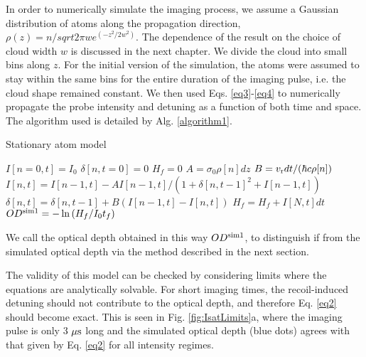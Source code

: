In order to numerically simulate the imaging process, we assume a Gaussian distribution of atoms along the propagation direction, $\rho(z) = n/sqrt{2\pi}w e^(-z^2/2w^2)$. The dependence of the result on the choice of cloud  width $w$ is discussed in the next chapter. We divide the cloud into small bins along $z$. For the initial version of the simulation, the atoms were assumed to stay within the same bins for the entire duration of the imaging pulse, i.e. the cloud shape remained constant. We then used Eqs. \ref{eq3}-\ref{eq4} to numerically propagate the probe intensity and detuning as a function of both time and space. The algorithm used is detailed by Alg. \ref{algorithm1}.
%

\begin{algorithm}
\caption{Stationary atom model}
\label{algorithm1}
\begin{algorithmic}
\STATE $I[n=0,t]=I_0$ 
\STATE $\delta[n, t=0]=0$ 
\STATE $H_f=0$ 
 \STATE $A=\sigma_0\rho[n] dz$ 
 \STATE $B=v_{\rm{r}} dt/(\hbar c \rho[n])$  
\STATE $I[n,t]=I[n-1,t] - A I[n-1,t]/(1+\delta[n,t-1]^2+I[n-1,t])$  
\STATE $\delta[n,t]=\delta[n,t-1]+B\left(I[n-1,t]-I[n,t]\right)$  
\ENDFOR
\STATE $H_f =H_f+ I[N,t]dt$ 
\ENDFOR
\STATE $OD^{\rm{sim1}}=-\ln{(H_f/I_0t_f)}$
\end{algorithmic}
\end{algorithm}

We call the optical depth obtained in this way $OD^{\rm{sim1}}$, to distinguish if from the simulated optical depth via the method described in the next section. 

The validity of this model can be checked by considering limits where the equations are analytically solvable. For short imaging times, the recoil-induced detuning should not contribute to the optical depth, and therefore Eq. \ref{eq2} should become exact. This is seen in Fig. \ref{fig:IsatLimits}a, where the imaging pulse is only 3 $\mu \rm{s}$ long and the simulated optical depth (blue dots) agrees with that given by Eq. \ref{eq2} for all intensity regimes.  


